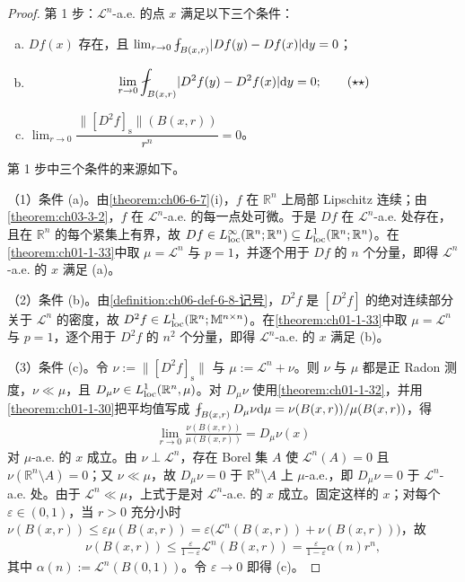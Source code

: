 \documentclass[../../main.tex]{subfiles}%
\begin{document}
\begin{proof}
第 1 步：$\mathcal{L}^{n}$-a.e. 的点 $x$ 满足以下三个条件：
\begin{enumerate}[(a)]
\item $Df(x)$ 存在，且 $\lim_{r\to0}\fint_{B(x,r)}\lvert Df(y)-Df(x)\rvert\diff y=0$；
\item
\begin{align*}
\lim_{r\to0}\fint_{B(x,r)}\lvert D^{2}f(y)-D^{2}f(x)\rvert\diff y=0;\qquad(\star\star)
\end{align*}
\item $\lim_{r\to0}\dfrac{\lVert[D^{2}f]_{\mathrm{s}}\rVert(B(x,r))}{r^{n}}=0$。
\end{enumerate}

第 1 步中三个条件的来源如下。

（1）条件 (a)。由\cref{theorem:ch06-6-7}(i)，$f$ 在 $\mathbb{R}^{n}$ 上局部 Lipschitz 连续；由\cref{theorem:ch03-3-2}，$f$ 在 $\mathcal{L}^{n}$-a.e. 的每一点处可微。于是 $Df$ 在 $\mathcal{L}^{n}$-a.e. 处存在，且在 $\mathbb{R}^{n}$ 的每个紧集上有界，故 $Df\in L^{\infty}_{\mathrm{loc}}(\mathbb{R}^{n};\mathbb{R}^{n})\subseteq L^{1}_{\mathrm{loc}}(\mathbb{R}^{n};\mathbb{R}^{n})$。在\cref{theorem:ch01-1-33}中取 $\mu=\mathcal{L}^{n}$ 与 $p=1$，并逐个用于 $Df$ 的 $n$ 个分量，即得 $\mathcal{L}^{n}$-a.e. 的 $x$ 满足 (a)。%

（2）条件 (b)。由\cref{definition:ch06-def-6-8-记号}，$D^{2}f$ 是 $[D^{2}f]$ 的绝对连续部分关于 $\mathcal{L}^{n}$ 的密度，故 $D^{2}f\in L^{1}_{\mathrm{loc}}(\mathbb{R}^{n};\mathbb{M}^{n\times n})$。在\cref{theorem:ch01-1-33}中取 $\mu=\mathcal{L}^{n}$ 与 $p=1$，逐个用于 $D^{2}f$ 的 $n^{2}$ 个分量，即得 $\mathcal{L}^{n}$-a.e. 的 $x$ 满足 (b)。%

（3）条件 (c)。令 $\nu:=\lVert[D^{2}f]_{\mathrm{s}}\rVert$ 与 $\mu:=\mathcal{L}^{n}+\nu$。则 $\nu$ 与 $\mu$ 都是正 Radon 测度，$\nu\ll\mu$，且 $D_{\mu}\nu\in L^{1}_{\mathrm{loc}}(\mathbb{R}^{n},\mu)$。对 $D_{\mu}\nu$ 使用\cref{theorem:ch01-1-32}，并用\cref{theorem:ch01-1-30}把平均值写成 $\fint_{B(x,r)}D_{\mu}\nu\diff\mu=\nu(B(x,r))/\mu(B(x,r))$，得%
\begin{align*}
\lim_{r\to0}\frac{\nu(B(x,r))}{\mu(B(x,r))}=D_{\mu}\nu(x)
\end{align*}
对 $\mu$-a.e. 的 $x$ 成立。由 $\nu\perp\mathcal{L}^{n}$，存在 Borel 集 $A$ 使 $\mathcal{L}^{n}(A)=0$ 且 $\nu(\mathbb{R}^{n}\setminus A)=0$；又 $\nu\ll\mu$，故 $D_{\mu}\nu=0$ 于 $\mathbb{R}^{n}\setminus A$ 上 $\mu$-a.e.，即 $D_{\mu}\nu=0$ 于 $\mathcal{L}^{n}$-a.e. 处。由于 $\mathcal{L}^{n}\ll\mu$，上式于是对 $\mathcal{L}^{n}$-a.e. 的 $x$ 成立。固定这样的 $x$；对每个 $\varepsilon\in(0,1)$，当 $r>0$ 充分小时 $\nu(B(x,r))\leqslant\varepsilon\mu(B(x,r))=\varepsilon\bigl(\mathcal{L}^{n}(B(x,r))+\nu(B(x,r))\bigr)$，故
\begin{align*}
\nu(B(x,r))\leqslant\frac{\varepsilon}{1-\varepsilon}\mathcal{L}^{n}(B(x,r))=\frac{\varepsilon}{1-\varepsilon}\alpha(n)r^{n},
\end{align*}
其中 $\alpha(n):=\mathcal{L}^{n}(B(0,1))$。令 $\varepsilon\to0$ 即得 (c)。%



\end{proof}
\end{document}
